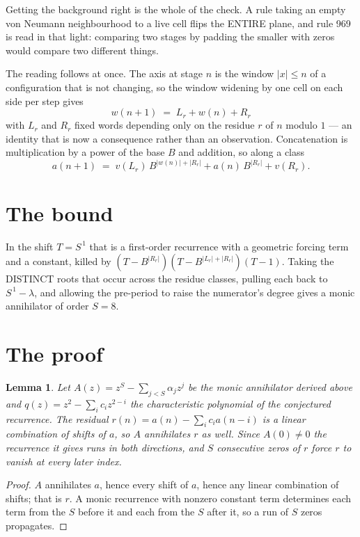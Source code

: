 \documentclass[11pt,a4paper]{article}
\theoremstyle{plain}
\newtheorem{lemma}[theorem]{Lemma}
\theoremstyle{definition}
\begin{document}
Getting the background right is the whole of the check. A rule taking an empty von Neumann
neighbourhood to a live cell flips the ENTIRE plane, and rule 969 is read
in that light: comparing two stages by padding the smaller with zeros would compare two
different things.

The reading follows at once. The axis at stage $n$ is the window $|x|\le n$ of a configuration
that is not changing, so the window widening by one cell on each side per step gives
\[
w(n+1)\;=\;L_r + w(n) + R_r
\]
with $L_r$ and $R_r$ fixed words depending only on the residue $r$ of $n$ modulo $1$ --- an
identity that is now a consequence rather than an observation. Concatenation is multiplication
by a power of the base $B$ and addition, so along a class
\[
a(n+1)\;=\;v(L_r)\,B^{|w(n)|+|R_r|} + a(n)\,B^{|R_r|} + v(R_r).
\]

\section{The bound}

In the shift $T=S^{\,1}$ that is a first-order recurrence with a geometric forcing term and a
constant, killed by $(T-B^{|R_r|})(T-B^{|L_r|+|R_r|})(T-1)$. Taking the DISTINCT roots that
occur across the residue classes, pulling each back to $S^{\,1}-\lambda$, and allowing the
pre-period to raise the numerator's degree gives a monic annihilator of order $S=8$.

\section{The proof}

\begin{lemma}\label{lem:crit}
Let $A(z)=z^S-\sum_{j<S}\alpha_jz^{j}$ be the monic annihilator derived above and
$q(z)=z^{2}-\sum_ic_iz^{2-i}$ the characteristic polynomial of the conjectured
recurrence. The residual $r(n)=a(n)-\sum_ic_ia(n-i)$ is a linear combination of shifts of $a$,
so $A$ annihilates $r$ as well. Since $A(0)\ne0$ the recurrence it gives runs in both
directions, and $S$ consecutive zeros of $r$ force $r$ to vanish at every later index.
\end{lemma}

\begin{proof}
$A$ annihilates $a$, hence every shift of $a$, hence any linear combination of shifts; that is
$r$. A monic recurrence with nonzero constant term determines each term from the $S$ before it
and each from the $S$ after it, so a run of $S$ zeros propagates.
\end{proof}
\end{document}
